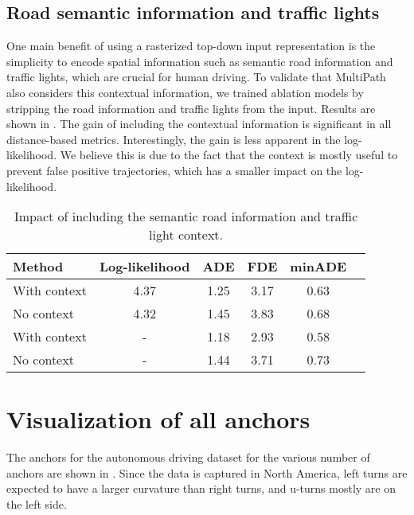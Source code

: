 \documentclass{article}
\newcommand{\multiflow}{MultiPath\xspace}
\begin{document}
\subsection{Road semantic information and traffic lights}
\label{sec:roadgraph}

One main benefit of using a rasterized top-down input representation is the simplicity to encode spatial information such as semantic road information and traffic lights, which are crucial for human driving. To validate that \multiflow also considers this contextual information, we trained ablation models by stripping the road information and traffic lights from the input. Results are shown in . The gain of including the contextual information is significant in all distance-based metrics. Interestingly, the gain is less apparent in the log-likelihood. We believe this is due to the fact that the context is mostly useful to prevent false positive trajectories, which has a smaller impact on the log-likelihood.


\begin{table}[!htbp]
\caption{Impact of including the semantic road information and traffic light context.}
\label{tbl:context}
\centering
\begin{tabular}{lccccc}
\toprule
\multirow{1}{*}{Method} & Log-likelihood  & ADE  & FDE  & minADE  \tabularnewline
\midrule
With context  & 4.37 & 1.25 & 3.17 & 0.63  \tabularnewline
No context  & 4.32 & 1.45 & 3.83 & 0.68 \tabularnewline
\midrule 
With context  & - & 1.18 & 2.93 & 0.58 \tabularnewline
No context  & - & 1.44 & 	3.71 & 	0.73 \tabularnewline
\bottomrule
\end{tabular}
\end{table}


\section{Visualization of all anchors}
\label{sec:viz_clusters}

The anchors for the autonomous driving dataset for the various number of anchors  are shown in . Since the data is captured in North America, left turns are expected to have a larger curvature than right turns, and u-turns mostly are on the left side. 
\end{document}
